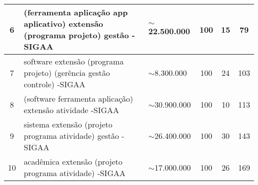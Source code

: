 \begin{table}
{\begin{tabular}{|c|l|l|c|c|c|}
      \hline
      6                                     & (ferramenta \textbar{} aplicação \textbar{} app \textbar{} aplicativo) extensão (programa \textbar{} projeto) gestão -SIGAA & $\sim$22.500.000 & 100                                                   & 15                                                                           & 79                                \\
      \hline
      7                                     & software extensão (programa \textbar{} projeto) (gerência \textbar{} gestão \textbar{} controle) -SIGAA                     & $\sim$8.300.000  & 100                                                   & 24                                                                           & 103                               \\
      \hline
      8                                     & (software \textbar{} ferramenta \textbar{} aplicação) extensão atividade -SIGAA                                             & $\sim$30.900.000 & 100                                                   & 10                                                                           & 113                               \\
      \hline
      9                                     & sistema extensão (projeto \textbar{} programa \textbar{} atividade) gestão -SIGAA                                           & $\sim$26.400.000 & 100                                                   & 30                                                                           & 143                               \\
      \hline
      10                                    & acadêmica extensão (projeto \textbar{} programa \textbar{} atividade) -SIGAA                                                & $\sim$17.000.000 & 100                                                   & 26                                                                           & 169                               \\
      \hline
    \end{tabular}
  }
\end{table}